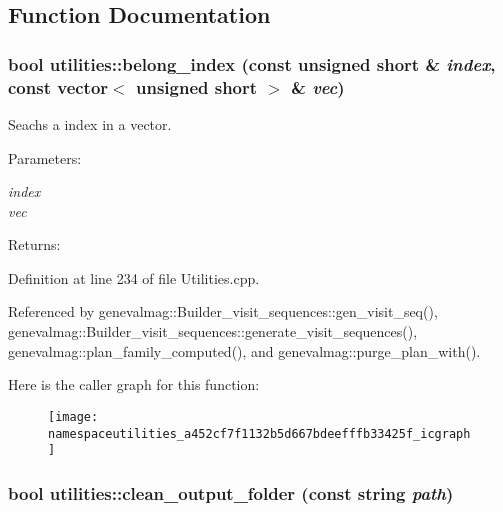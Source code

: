 \subsection{Function Documentation}
\hypertarget{namespaceutilities_a452cf7f1132b5d667bdeefffb33425f}{
\subsubsection[{belong\_\-index}]{\setlength{\rightskip}{0pt plus 5cm}bool utilities::belong\_\-index (const unsigned short \& {\em index}, \/  const vector$<$ unsigned short $>$ \& {\em vec})}}
\label{namespaceutilities_a452cf7f1132b5d667bdeefffb33425f}


Seachs a index in a vector. \begin{Desc}
\item[Parameters:]
\begin{description}
\item[{\em index}]\item[{\em vec}]\end{description}
\end{Desc}
\begin{Desc}
\item[Returns:]\end{Desc}


Definition at line 234 of file Utilities.cpp.

Referenced by genevalmag::Builder\_\-visit\_\-sequences::gen\_\-visit\_\-seq(), genevalmag::Builder\_\-visit\_\-sequences::generate\_\-visit\_\-sequences(), genevalmag::plan\_\-family\_\-computed(), and genevalmag::purge\_\-plan\_\-with().

Here is the caller graph for this function:\nopagebreak
\begin{figure}[H]
\begin{center}
\leavevmode
\texttt{[image: namespaceutilities\_a452cf7f1132b5d667bdeefffb33425f\_icgraph]}
\end{center}
\end{figure}
\hypertarget{namespaceutilities_28f2ace508b6ea5bc7af05b84f0b2487}{
\subsubsection[{clean\_\-output\_\-folder}]{\setlength{\rightskip}{0pt plus 5cm}bool utilities::clean\_\-output\_\-folder (const string {\em path})}}
\label{namespaceutilities_28f2ace508b6ea5bc7af05b84f0b2487}


